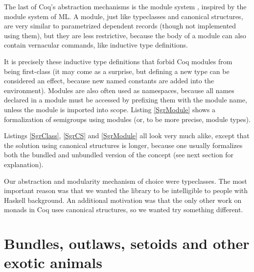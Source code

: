\documentclass[declaration,inz,english,shortabstract]{iithesis}
\begin{document}
The last of Coq's abstraction mechanisms is the module system \cite{Modules1} \cite{Modules2}, inspired by the module system of ML. A module, just like typeclasses and canonical structures, are very similar to parametrized dependent records (though not implemented using them), but they are less restrictive, because the body of a module can also contain vernacular commands, like inductive type definitions.

It is precisely these inductive type definitions that forbid Coq modules from being first-class (it may come as a surprise, but defining a new type can be considered an effect, because new named constants are added into the environment). Modules are also often used as namespaces, because all names declared in a module must be accessed by prefixing them with the module name, unless the module is imported into scope. Listing \ref{SgrModule} shows a formalization of semigroups using modules (or, to be more precise, module types).


Listings \ref{SgrClass}, \ref{SgrCS} and \ref{SgrModule} all look very much alike, except that the solution using canonical structures is longer, because one usually formalizes both the bundled and unbundled version of the concept (see next section for explanation).

Our abstraction and modularity mechanism of choice were typeclasses. The most important reason was that we wanted the library to be intelligible to people with Haskell background. An additional motivation was that the only other work on monads in Coq \cite{MERC} uses canonical structures, so we wanted try something different.

\section{Bundles, outlaws, setoids and other exotic animals}
\end{document}
